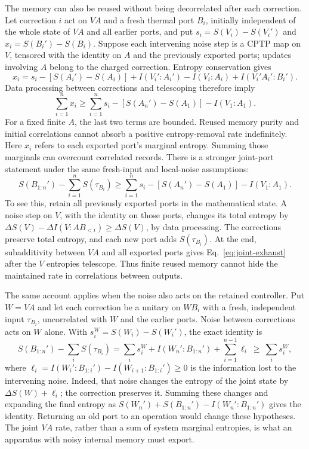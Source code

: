 The memory can also be reused without being decorrelated after each correction.
Let correction $i$ act on $VA$ and a fresh thermal port $B_i$, initially independent
of the whole state of $VA$ and all earlier ports, and put
$s_i=S(V_i)-S(V_i')$ and $x_i=S(B_i')-S(B_i)$.
Suppose each intervening noise step is a CPTP map on $V$, tensored with the
identity on $A$ and the previously exported ports; updates involving $A$ belong
to the charged correction. Entropy conservation gives
\[
 x_i=s_i-[S(A_i')-S(A_i)]
       +I(V_i':A_i')-I(V_i:A_i)+I(V_i'A_i':B_i').
\]
Data processing between corrections and telescoping therefore imply
\begin{equation}\label{eq:reused-memory}
 \sum_{i=1}^n x_i\ge
 \sum_{i=1}^n s_i-[S(A_n')-S(A_1)]-I(V_1:A_1).
\end{equation}
For a fixed finite $A$, the last two terms are bounded. Reused memory purity and
initial correlations cannot absorb a positive entropy-removal rate indefinitely.
Here $x_i$ refers to each exported port's marginal entropy. Summing those marginals
can overcount correlated records. There is a stronger joint-port statement under
the same fresh-input and local-noise assumptions:
\begin{equation}\label{eq:joint-exhaust}
 S(B_{1:n}')-\sum_{i=1}^n S(\tau_{B_i})\ge
 \sum_{i=1}^n s_i-[S(A_n')-S(A_1)]-I(V_1:A_1).
\end{equation}
To see this, retain all previously exported ports in the mathematical state.
A noise step on $V$, with the identity on those ports, changes its
total entropy by $\Delta S(V)-\Delta I(V:A B_{<i})\ge\Delta S(V)$, by data
processing. The corrections preserve total entropy, and each new port adds
$S(\tau_{B_i})$. At the end, subadditivity between $VA$ and all exported ports
gives Eq.~\eqref{eq:joint-exhaust} after the $V$ entropies telescope. Thus finite
reused memory cannot hide the maintained rate in correlations between outputs.

The same account applies when the noise also acts on the retained controller.
Put $W=VA$ and let each correction be a unitary on $WB_i$ with a fresh,
independent input $\tau_{B_i}$, uncorrelated with $W$ and the earlier ports.
Noise between corrections acts on $W$ alone.
With $s_i^W=S(W_i)-S(W_i')$, the exact identity is
\begin{equation}\label{eq:joint-VA-exhaust}
 S(B_{1:n}')-\sum_iS(\tau_{B_i})
 =\sum_i s_i^W+I(W_n':B_{1:n}')+\sum_{i=1}^{n-1}\ell_i
 \ \ge\ \sum_i s_i^W,
\end{equation}
where $\ell_i=I(W_i':B_{1:i}')-I(W_{i+1}:B_{1:i}')\ge0$ is the information
lost to the intervening noise. Indeed, that noise changes the entropy of the
joint state by $\Delta S(W)+\ell_i$; the correction preserves it. Summing these
changes and expanding the final entropy as $S(W_n')+S(B_{1:n}')-I(W_n':B_{1:n}')$
gives the identity. Returning an old port to an operation would change these
hypotheses. The joint $VA$ rate, rather than a sum of system marginal entropies,
is what an apparatus with noisy internal memory must export.



